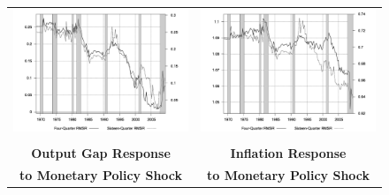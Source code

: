 \documentclass[10pt]{article}
\begin{document}
{\begin{figure}
\begin{tabular}{cc}
\includegraphics[scale=0.17]{images/RMS16_Output_Gap_Cost_Shock.png} & \includegraphics[scale=0.17]{images/RMS16_Inflation_Cost_Shock.png} \\\\
\textbf{Output Gap Response} & \textbf{Inflation Response} \\
\textbf{to Monetary Policy Shock} & \textbf{to Monetary Policy Shock}  \\

\end{tabular}
\end{figure}}
\end{document}
